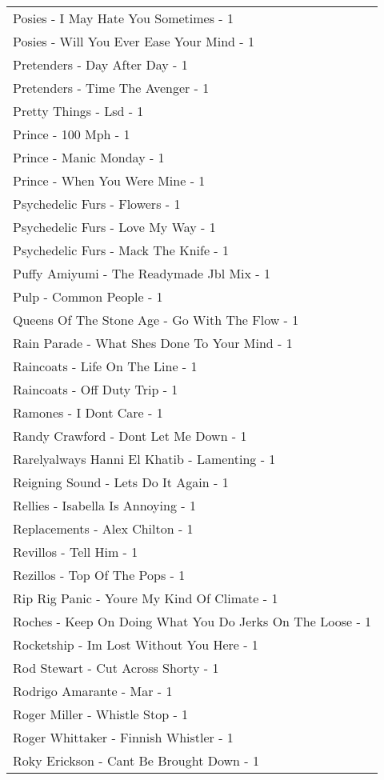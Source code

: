 \documentclass[
]{article}
\begin{document}
\begin{longtable}{l}
Posies - I May Hate You Sometimes - 1 \\ 
Posies - Will You Ever Ease Your Mind - 1 \\ 
Pretenders - Day After Day - 1 \\ 
Pretenders - Time The Avenger - 1 \\ 
Pretty Things - Lsd - 1 \\ 
Prince - 100 Mph - 1 \\ 
Prince - Manic Monday - 1 \\ 
Prince - When You Were Mine - 1 \\ 
Psychedelic Furs - Flowers - 1 \\ 
Psychedelic Furs - Love My Way - 1 \\ 
Psychedelic Furs - Mack The Knife - 1 \\ 
Puffy Amiyumi - The Readymade Jbl Mix - 1 \\ 
Pulp - Common People - 1 \\ 
Queens Of The Stone Age - Go With The Flow - 1 \\ 
Rain Parade - What Shes Done To Your Mind - 1 \\ 
Raincoats - Life On The Line - 1 \\ 
Raincoats - Off Duty Trip - 1 \\ 
Ramones - I Dont Care - 1 \\ 
Randy Crawford - Dont Let Me Down - 1 \\ 
Rarelyalways Hanni El Khatib - Lamenting - 1 \\ 
Reigning Sound - Lets Do It Again - 1 \\ 
Rellies - Isabella Is Annoying - 1 \\ 
Replacements - Alex Chilton - 1 \\ 
Revillos - Tell Him - 1 \\ 
Rezillos - Top Of The Pops - 1 \\ 
Rip Rig Panic - Youre My Kind Of Climate - 1 \\ 
Roches - Keep On Doing What You Do Jerks On The Loose - 1 \\ 
Rocketship - Im Lost Without You Here - 1 \\ 
Rod Stewart - Cut Across Shorty - 1 \\ 
Rodrigo Amarante - Mar - 1 \\ 
Roger Miller - Whistle Stop - 1 \\ 
Roger Whittaker - Finnish Whistler - 1 \\ 
Roky Erickson - Cant Be Brought Down - 1 \\ 

\end{longtable}
\end{document}
